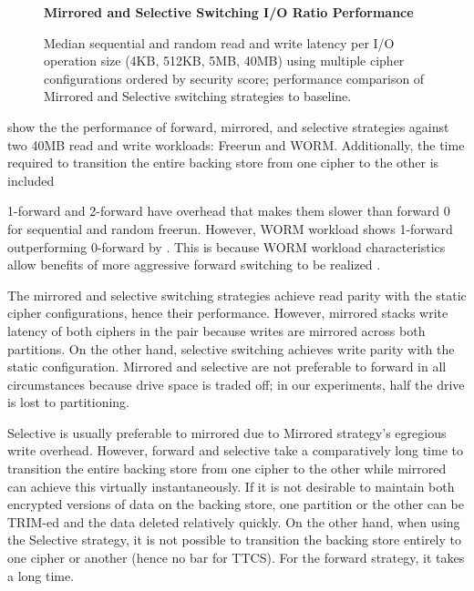 \begin{figure*}[ht]
   \textbf{Mirrored and Selective Switching I/O Ratio Performance}\par\medskip
   \centering
   {} \caption{Median sequential
   and random read and write latency per I/O operation size (4KB, 512KB, 5MB,
   40MB) using multiple cipher configurations ordered by security score;
   performance comparison of Mirrored and Selective switching strategies to
   baseline.}
  \label{fig:mirrored-selective-baseline}
\end{figure*}

 show the the performance of forward,
mirrored, and selective strategies against two 40MB read and write workloads:
Freerun and WORM.  Additionally, the time
required to transition the entire backing store from one cipher to the other is
included 

1-forward and 2-forward have overhead that makes them slower than forward 0 for
sequential and random freerun. However, WORM workload shows 1-forward
outperforming 0-forward by . This is
because WORM workload characteristics allow benefits of more aggressive forward
switching to be realized .

The mirrored and selective switching strategies achieve read parity with the
static cipher configurations, hence their performance. However, mirrored stacks
write latency of both ciphers in the pair because writes are mirrored across
both partitions. On the other hand, selective switching achieves write parity
with the static configuration. Mirrored and selective are not preferable to
forward in all circumstances because drive space is traded off; in our
experiments, half the drive is lost to partitioning.


Selective is usually preferable to mirrored due to Mirrored strategy's egregious
write overhead. However, forward and selective take a comparatively long time to
transition the entire backing store from one cipher to the other while mirrored
can achieve this virtually instantaneously. If it is not desirable to maintain
both encrypted versions of data on the backing store, one partition or the other
can be TRIM-ed and the data deleted relatively quickly. On the other hand, when
using the Selective strategy, it is not possible to transition the backing store
entirely to one cipher or another (hence no bar for TTCS). For the forward
strategy, it takes a long time. 

